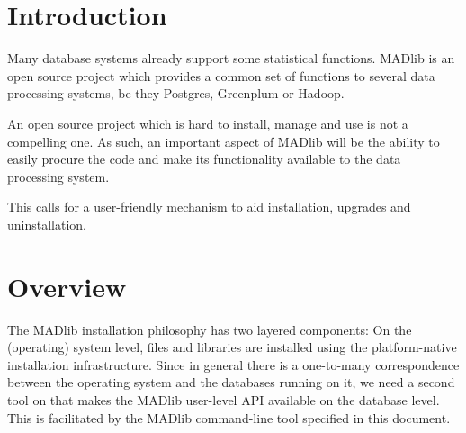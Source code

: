 \documentclass[11pt]{article}
\newcommand{\versionnumber}{0.2}
\begin{document}
{
\noindent\hspace*{\centeroffset}

\noindent\makebox[0pt][l]
{\begin{minipage}{\textwidth}
\flushright
Version~\versionnumber{}
\end{minipage}}

\newpage

\tableofcontents
\newpage

\section{Introduction}

Many database systems already support some statistical functions. MADlib is an open source project which provides a common set of functions to several data processing systems, be they Postgres, Greenplum or Hadoop.

An open source project which is hard to install, manage and use is not a compelling one. As such, an important aspect of MADlib will be the ability to easily procure the code and make its functionality available to the data processing system.

This calls for a user-friendly mechanism to aid installation, upgrades and uninstallation.

\ifx\pdfoutput\undefined %
\else
{}
\fi
\section{Overview}

The MADlib installation philosophy has two layered components: On the (operating) system level, files and libraries are installed using the platform-native installation infrastructure. Since in general there is a one-to-many correspondence between the operating system and the databases running on it, we need a second tool on that makes the MADlib user-level API available on the database level. This is facilitated by the MADlib command-line tool specified in this document. 

}
\end{document}
